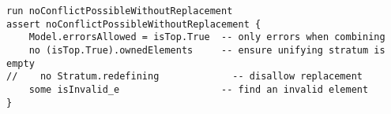 \lstset{frame=tb, aboveskip=12pt, belowskip=-3pt, breaklines=true, basicstyle=\small\ttfamily, tabsize=2, mathescape=true}
\begin{lstlisting}[caption={facts.als, lines 62-68}, label=alloy:replacement-causes-conflict, captionpos=b]
run noConflictPossibleWithoutReplacement
assert noConflictPossibleWithoutReplacement {
    Model.errorsAllowed = isTop.True  -- only errors when combining
    no (isTop.True).ownedElements     -- ensure unifying stratum is empty
//    no Stratum.redefining             -- disallow replacement
    some isInvalid_e                  -- find an invalid element
}
\end{lstlisting}
